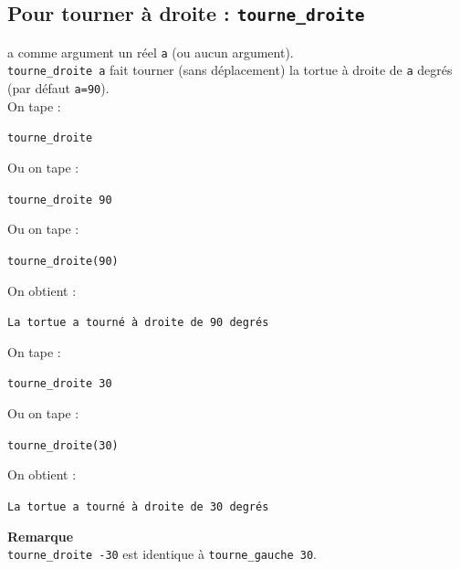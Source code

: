 \documentclass[a4paper,11pt]{book}
\begin{document}
\subsection{Pour tourner \`a droite : {\tt tourne\_droite}}
 a comme argument un r\'eel {\tt a} (ou aucun 
argument).\\
{\tt tourne\_droite a} fait tourner (sans d\'eplacement) la tortue \`a droite 
de {\tt a} degr\'es (par d\'efaut {\tt a=90}).\\
On tape :
\begin{center}{\tt tourne\_droite}\end{center}
Ou on tape :
\begin{center}{\tt tourne\_droite 90}\end{center}
Ou on tape :
\begin{center}{\tt tourne\_droite(90)}\end{center}
On obtient :
\begin{center}{\tt La tortue a tourn\'e \`a droite de 90 degr\'es}\end{center}
On tape :
\begin{center}{\tt tourne\_droite 30}\end{center}
Ou on tape :
\begin{center}{\tt tourne\_droite(30)}\end{center}
On obtient :
\begin{center}{\tt La tortue a tourn\'e \`a droite de 30 degr\'es}\end{center}
{\bf Remarque}\\
{\tt tourne\_droite -30} est identique \`a {\tt tourne\_gauche 30}.
\end{document}
